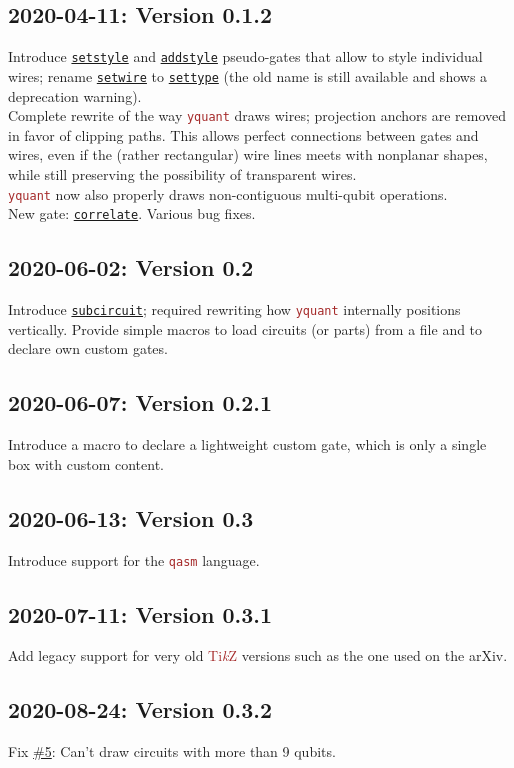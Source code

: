 \documentclass{scrartcl}
\def\TikZ{\textcolor{brown}{Ti\textit kZ}}
\def\pkg#1{\textcolor{brown}{\texttt{#1}}}
\def\gate#1{\hyperref[gate:#1]{\texttt{#1}}}
\def\Yquant{\pkg{yquant}}
\begin{document}
      \subsection*{2020-04-11: Version 0.1.2}
         Introduce \gate{setstyle} and \gate{addstyle} pseudo\hyp gates that allow to style individual wires; rename \gate{setwire} to \gate{settype} (the old name is still available and shows a deprecation warning). \\
         Complete rewrite of the way \Yquant{} draws wires; projection anchors are removed in favor of clipping paths.
         This allows perfect connections between gates and wires, even if the (rather rectangular) wire lines meets with nonplanar shapes, while still preserving the possibility of transparent wires. \\
         \Yquant{} now also properly draws non\hyp contiguous multi\hyp qubit operations. \\
         New gate: \gate{correlate}.
         Various bug fixes.

      \subsection*{2020-06-02: Version 0.2}
         Introduce \gate{subcircuit}; required rewriting how \Yquant{} internally positions vertically.
         Provide simple macros to load circuits (or parts) from a file and to declare own custom gates.

      \subsection*{2020-06-07: Version 0.2.1}
         Introduce a macro to declare a lightweight custom gate, which is only a single box with custom content.

      \subsection*{2020-06-13: Version 0.3}
         Introduce support for the \pkg{qasm} language.

      \subsection*{2020-07-11: Version 0.3.1}
         Add legacy support for very old \TikZ{} versions such as the one used on the arXiv.

      \subsection*{2020-08-24: Version 0.3.2}
         Fix \href{https://github.com/projekter/yquant/issues/5}{\#5}: Can't draw circuits with more than 9 qubits.
\end{document}
